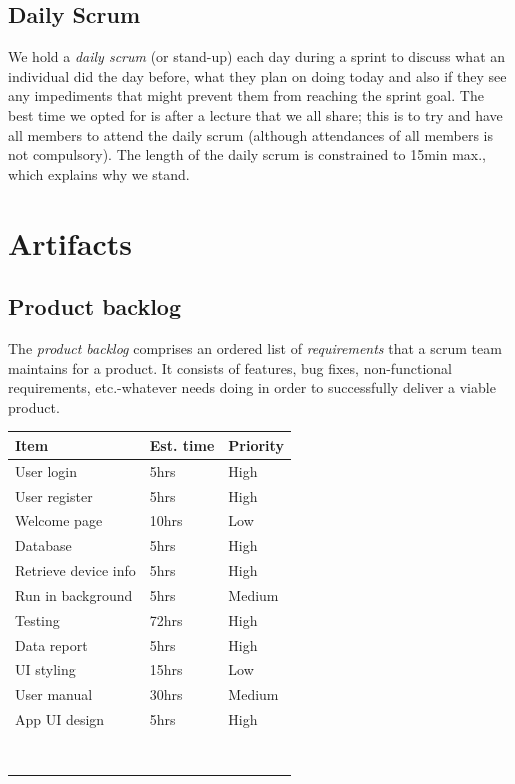 \documentclass[hidelinks, 12pt, oneside]{article}
\begin{document}
	\subsection{Daily Scrum}
 	We hold a \emph{daily scrum} (or stand-up) each day during a sprint to discuss what an individual did the day before, what they plan on doing today and also if they 
 	see any impediments that might prevent them from reaching the sprint goal. The best time we opted for is after a lecture that we all share; this is to try and have 
 	all members	to attend the daily scrum (although attendances of all members is not compulsory). The length of the daily scrum is constrained to 15min max., which explains 
 	why we stand.\newpage 
 	
 	\section{Artifacts}
 	\subsection{Product backlog}
 	The \emph{product backlog} comprises an ordered list of \emph{requirements} that a scrum team maintains for a product. It consists of features, bug fixes, non-functional 
 	requirements, etc.-whatever needs doing in order to successfully deliver a viable product.\newline\newline 	
 	\begin{tabular}{|p{6cm}|p{4cm}|p{3cm}|}
			\textbf{Item} & \textbf{Est. time} & \textbf{Priority}\\
			\hline
			User login & 5hrs & High\\
			\hline
			User register & 5hrs & High\\
			\hline
			Welcome page & 10hrs & Low\\
			\hline
			Database & 5hrs & High\\
			\hline
			Retrieve device info & 5hrs & High\\
			\hline
			Run in background & 5hrs & Medium\\
			\hline
			Testing & 72hrs & High\\
			\hline
			Data report & 5hrs & High\\
			\hline
			UI styling & 15hrs & Low\\
			\hline
			User manual & 30hrs & Medium\\
			\hline
			App UI design & 5hrs & High\\
			\hline
			&&\\
			\hline
			&&\\
			\hline
			&&\\
			\hline
			&&\\
			\hline
			&&\\
			\hline
			&&\\
			\hline
			&&\\
			\hline
			&&\\
			\hline
		\end{tabular}\newpage
		
\end{document}
